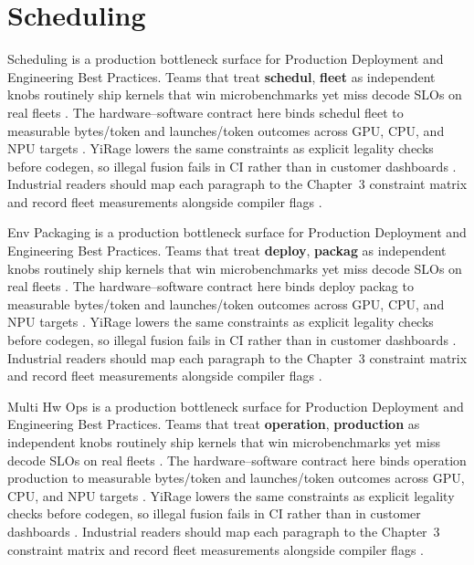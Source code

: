 \section{Scheduling}
\label{sec:scheduling}

Scheduling is a production bottleneck surface for Production Deployment and Engineering Best Practices. Teams that treat \textbf{schedul}, \textbf{fleet} as independent knobs routinely ship kernels that win microbenchmarks yet miss decode SLOs on real fleets \citep{nvidia2022hopper,amd2024aie}. The hardware--software contract here binds schedul fleet to measurable bytes/token and launches/token outcomes across GPU, CPU, and NPU targets \citep{semianalysis2024tma,dlbook}. YiRage lowers the same constraints as explicit legality checks before codegen, so illegal fusion fails in CI rather than in customer dashboards \citep{amd2024xdna,dao2022flashattention}. Industrial readers should map each paragraph to the Chapter~3 constraint matrix and record fleet measurements alongside compiler flags \citep{amd2024aie,kwon2023vllm}.

Env Packaging is a production bottleneck surface for Production Deployment and Engineering Best Practices. Teams that treat \textbf{deploy}, \textbf{packag} as independent knobs routinely ship kernels that win microbenchmarks yet miss decode SLOs on real fleets \citep{taxbreak2026,semianalysis2024tma}. The hardware--software contract here binds deploy packag to measurable bytes/token and launches/token outcomes across GPU, CPU, and NPU targets \citep{memoryfloor2026,amd2024xdna}. YiRage lowers the same constraints as explicit legality checks before codegen, so illegal fusion fails in CI rather than in customer dashboards \citep{nvidia2022hopper,amd2024aie}. Industrial readers should map each paragraph to the Chapter~3 constraint matrix and record fleet measurements alongside compiler flags \citep{semianalysis2024tma,dlbook}.

Multi Hw Ops is a production bottleneck surface for Production Deployment and Engineering Best Practices. Teams that treat \textbf{operation}, \textbf{production} as independent knobs routinely ship kernels that win microbenchmarks yet miss decode SLOs on real fleets \citep{memoryfloor2026,amd2024xdna}. The hardware--software contract here binds operation production to measurable bytes/token and launches/token outcomes across GPU, CPU, and NPU targets \citep{nvidia2022hopper,amd2024aie}. YiRage lowers the same constraints as explicit legality checks before codegen, so illegal fusion fails in CI rather than in customer dashboards \citep{semianalysis2024tma,dlbook}. Industrial readers should map each paragraph to the Chapter~3 constraint matrix and record fleet measurements alongside compiler flags \citep{amd2024xdna,dao2022flashattention}.

